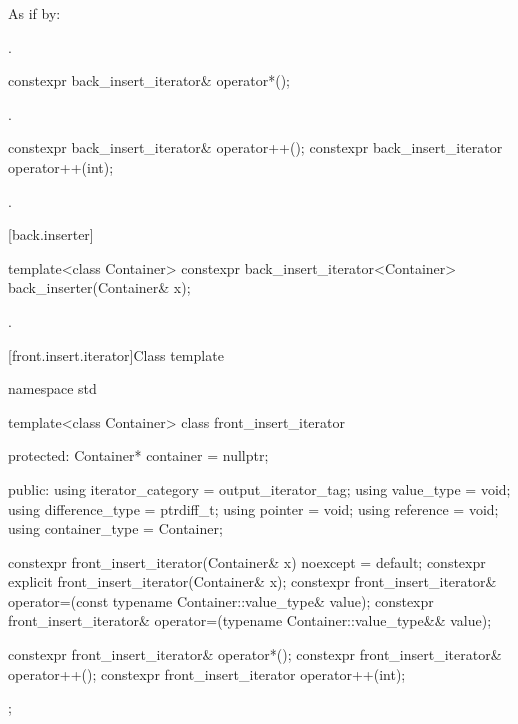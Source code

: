 \begin{itemdescr}
\pnum
\effects
As if by: 

\pnum
\returns
{}.
\end{itemdescr}

%
\begin{itemdecl}
constexpr back_insert_iterator& operator*();
\end{itemdecl}

\begin{itemdescr}
\pnum
\returns
{}.
\end{itemdescr}

%
\begin{itemdecl}
constexpr back_insert_iterator& operator++();
constexpr back_insert_iterator  operator++(int);
\end{itemdecl}

\begin{itemdescr}
\pnum
\returns
{}.
\end{itemdescr}

[back.inserter]{ }

%
\begin{itemdecl}
template<class Container>
  constexpr back_insert_iterator<Container> back_inserter(Container& x);
\end{itemdecl}

\begin{itemdescr}
\pnum
\returns
{}.
\end{itemdescr}

[front.insert.iterator]{Class template }

%
\begin{codeblock}
namespace std {
  template<class Container>
  class front_insert_iterator {
  protected:
    Container* container = nullptr;

  public:
    using iterator_category = output_iterator_tag;
    using value_type        = void;
    using difference_type   = ptrdiff_t;
    using pointer           = void;
    using reference         = void;
    using container_type    = Container;

    constexpr front_insert_iterator(Container& x) noexcept = default;
    constexpr explicit front_insert_iterator(Container& x);
    constexpr front_insert_iterator& operator=(const typename Container::value_type& value);
    constexpr front_insert_iterator& operator=(typename Container::value_type&& value);

    constexpr front_insert_iterator& operator*();
    constexpr front_insert_iterator& operator++();
    constexpr front_insert_iterator  operator++(int);
  };
}
\end{codeblock}

